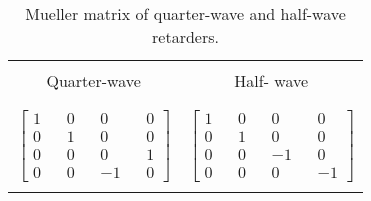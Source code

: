 \begin{table}
\small
\begin{center}
\caption{Mueller matrix of quarter-wave and half-wave retarders.}
\begin{tabular}{ c c }
   \hline
    &  \\[-2.5ex] 
    Quarter-wave & Half- wave\\
    &  \\[-2.5ex]
   \hline  
   &  \\[-1.5ex] 
   $\begin{bmatrix}
    1 & & 0 & & 0 & & 0 \\  0 & & 1 & & 0 & & 0 \\  0 & & 0 & & 0 & &  1 \\  0 & & 0 & & -1 & & 0     
   \end{bmatrix}$  &    
   $\begin{bmatrix}
   1 & & 0 & & 0 & & 0 \\  0 & & 1 & & 0 & & 0 \\  0 & & 0 & & -1 & & 0 \\  0 & & 0 & & 0 & & -1   
   \end{bmatrix}$\\   
    &  \\
       \hline   
  \end{tabular}
  \label{Tab:Chp4T2}
  \end{center}
\end{table}